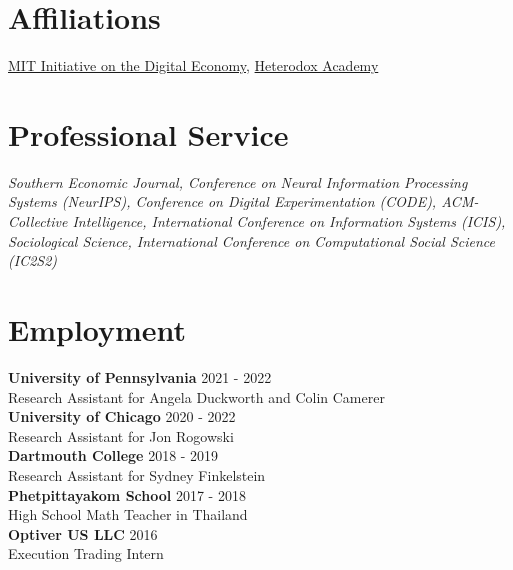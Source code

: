 \documentclass[margin,line,pifont,palatino,courier, 9pt]{res}
\begin{document}
\begin{resume}
\section{\sc Affiliations}
\href{https://ide.mit.edu/}{MIT Initiative on the Digital Economy}, \href{https://heterodoxacademy.org/}{Heterodox Academy}

\section{\sc Professional Service}
\textit{Southern Economic Journal, Conference on Neural Information Processing Systems (NeurIPS), Conference on Digital Experimentation (CODE), ACM-Collective Intelligence, International Conference on Information Systems (ICIS), Sociological Science, International Conference on Computational Social Science (IC2S2)}

\section{\sc Employment}
\textbf{University of Pennsylvania} \hfill 2021 - 2022 \\
Research Assistant for Angela Duckworth and Colin Camerer \vspace{2mm}\\
\textbf{University of Chicago} \hfill 2020 - 2022\\
Research Assistant for Jon Rogowski \vspace{2mm}\\
\textbf{Dartmouth College} \hfill 2018 - 2019 \\
Research Assistant for Sydney Finkelstein \vspace{2mm}\\
\textbf{Phetpittayakom School} \hfill 2017 - 2018 \\
High School Math Teacher in Thailand \vspace{2mm}\\ 
\textbf{Optiver US LLC} \hfill 2016 \\
Execution Trading Intern

\end{resume}
\end{document}
